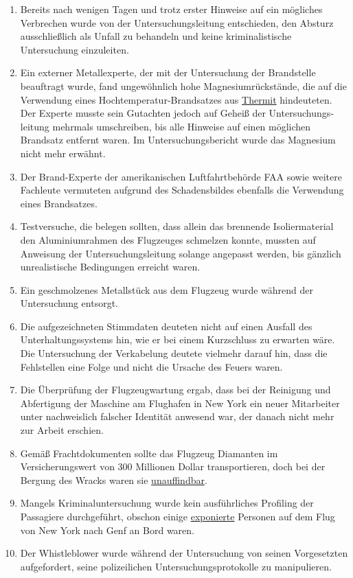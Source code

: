 \begin{enumerate}
\def\labelenumi{\arabic{enumi}.}
\tightlist
\item
  Bereits nach wenigen Tagen und trotz erster Hinweise auf ein mögliches
  Verbrechen wurde von der Untersuchungsleitung entschieden, den Absturz
  ausschließlich als Unfall zu behandeln und keine kriminalistische
  Untersuchung einzuleiten.
\item
  Ein externer Metallexperte, der mit der Untersuchung der Brandstelle
  beauftragt wurde, fand ungewöhnlich hohe Magnesiumrückstände, die auf
  die Verwendung eines Hoch­temperatur-Brand­satzes aus
  \href{https://en.wikipedia.org/wiki/Thermite}{Thermit} hindeuteten.
  Der Experte musste sein Gutachten jedoch auf Geheiß der
  Unter­suchungs­leitung mehrmals umschreiben, bis alle Hinweise auf
  einen möglichen Brandsatz entfernt waren. Im Untersuchungsbericht
  wurde das Magnesium nicht mehr erwähnt.
\item
  Der Brand-Experte der amerikanischen Luftfahrtbehörde FAA sowie
  weitere Fachleute vermuteten aufgrund des Schadensbildes ebenfalls die
  Verwendung eines Brandsatzes.
\item
  Testversuche, die belegen sollten, dass allein das brennende
  Isoliermaterial den Aluminium­rahmen des Flugzeuges schmelzen konnte,
  mussten auf Anweisung der Untersuchungs­leitung solange angepasst
  werden, bis gänzlich unrealistische Bedingungen erreicht waren.
\item
  Ein geschmolzenes Metallstück aus dem Flugzeug wurde während der
  Untersuchung entsorgt.
\item
  Die aufgezeichneten Stimmdaten deuteten nicht auf einen Ausfall des
  Unterhaltungssystems hin, wie er bei einem Kurzschluss zu erwarten
  wäre. Die Untersuchung der Verkabelung deutete vielmehr darauf hin,
  dass die Fehlstellen eine Folge und nicht die Ursache des Feuers
  waren.
\item
  Die Überprüfung der Flugzeugwartung ergab, dass bei der Reinigung und
  Abfertigung der Maschine am Flughafen in New York ein neuer
  Mitarbeiter unter nachweislich falscher Identität anwesend war, der
  danach nicht mehr zur Arbeit erschien.
\item
  Gemäß Frachtdokumenten sollte das Flugzeug Diamanten im
  Versicherungswert von 300 Millionen Dollar transportieren, doch bei
  der Bergung des Wracks waren sie
  \href{https://www.cbc.ca/news/canada/the-mystery-of-swissair-flight-111-s-diamond-cargo-1.1051965}{unauffindbar}.
\item
  Mangels Kriminaluntersuchung wurde kein ausführliches Profiling der
  Passagiere durchgeführt, obschon einige
  \href{https://www.cbc.ca/news/canada/swissair-crash-may-not-have-been-an-accident-ex-rcmp-1.1019738}{exponierte}
  Personen auf dem Flug von New York nach Genf an Bord waren.
\item
  Der Whistleblower wurde während der Untersuchung von seinen
  Vorgesetzten aufgefordert, seine polizeilichen Untersuchungsprotokolle
  zu manipulieren.
\end{enumerate}

